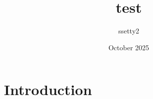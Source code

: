 \documentclass{article}
\title{test}
\author{ssetty2 }
\date{October 2025}
\begin{document}
\maketitle

\section{Introduction}
\end{document}
